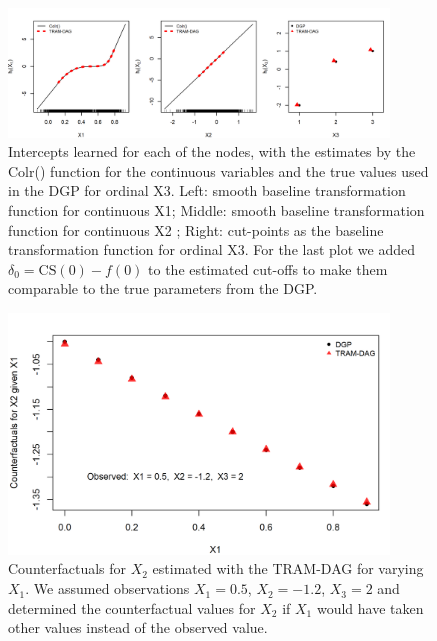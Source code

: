 \begin{figure}[htbp]
\centering
\includegraphics[width=0.9\textwidth]{img/exp1_baseline_trafo.png}
\caption{Intercepts learned for each of the nodes, with the estimates by the Colr() function for the continuous variables and the true values used in the DGP for ordinal X3. Left: smooth baseline transformation function for continuous X1; Middle: smooth baseline transformation function for continuous X2 ; Right: cut-points as the baseline transformation function for ordinal X3. For the last plot we added $\delta_0 = \text{CS}(0) - f(0)$ to the estimated cut-offs to make them comparable to the true parameters from the DGP.}
\label{fig:exp1_intercepts}
\end{figure}





\begin{figure}[htbp]
\centering
\includegraphics[width=0.9\textwidth]{img/exp1_counterfactuals.png}
\caption{Counterfactuals for $X_2$ estimated with the TRAM-DAG for varying $X_1$. We assumed observations $X_1 = 0.5$, $X_2 = -1.2$, $X_3 = 2$ and determined the counterfactual values for $X_2$ if $X_1$ would have taken other values instead of the observed value.}
\label{fig:exp1_counterfactuals}
\end{figure}


\clearpage


